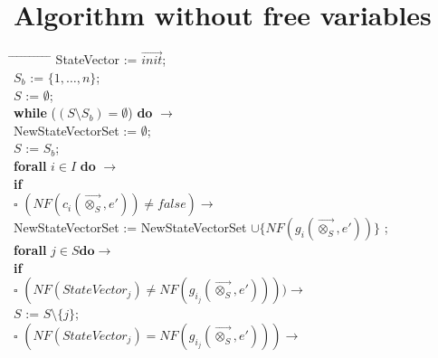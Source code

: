 \documentclass[a4paper,10pt]{article}
\theoremstyle{plain}
\theoremstyle{definition}
\newcommand{\ovr}{\overrightarrow}
\newcommand{\tb}{\textbf}
\newcommand{\ra}{$\rightarrow$}
\newcommand{\sq}{$\square$}
\begin{document}
\section{Algorithm without free variables} \label{sec:alg}
\begin{tabbing} 
\hspace*{5.mm} \= \hspace*{5.mm} \= \hspace*{5.mm} \= \hspace*{5.mm} \= \hspace*{5.mm} \= \hspace*{5.mm}  \= \hspace*{5.mm}  \= \hspace*{5.mm}  \= \hspace*{5.mm} \= \hspace*{5.mm} \= \hspace*{5.mm}\kill
StateVector := $\ovr{init}$; \\
$S_b$ := $\lbrace 1, \ldots, n \rbrace$; \\
$S$ := $\emptyset$;\\ 
\tb{while}  ($ (S \setminus S_b) = \emptyset $) \tb{do} \ra \\
  \> NewStateVectorSet := $\emptyset$;\\
  \> $S$ := $S_b$; \\
  \> \tb{forall} $i \in I$ \tb{do} \ra \\
  \>	\>	\tb{if} \\
  \>	\>	\sq \> $(NF(c_i(\ovr{\otimes_S},e')) \not= false) \rightarrow$ \\
  \>	\>	\> 	\>NewStateVectorSet := NewStateVectorSet $\cup \lbrace NF(g_i(\ovr{\otimes_S},e')) \rbrace$ ;\\  
  \>	\>	\>  	\>  \tb{forall} $j \in S \tb{do} \rightarrow$ \\
  \>	\>	\>  	\>	\>  	    \tb{if} \\
  \>	\>	\>  	\>   	\>         $\square$  \> $(NF(StateVector_j) \neq NF(g_{i_j}(\ovr{\otimes_S}, e')))) \rightarrow$ \\
  \>	\>	\>  	\>    	\>       \>    \>            $S$ := $S\setminus \lbrace j \rbrace$;\\
  \>	\>	\>  	\>    	\>        $\square$ \> $ (NF(StateVector_j) = NF(g_{i_j}(\ovr{\otimes_S}, e'))) \rightarrow$\\

\end{tabbing}
\end{document}
